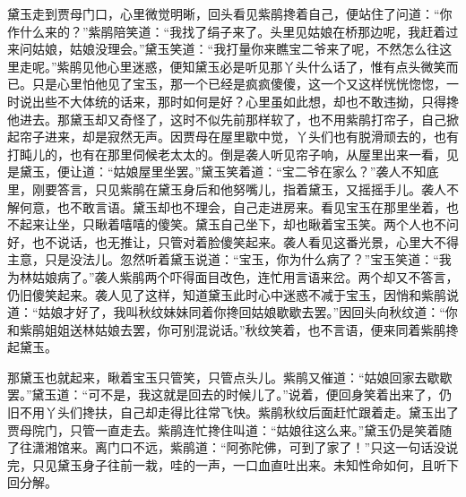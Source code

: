 \begin{parag}
    黛玉走到贾母门口，心里微觉明晰，回头看见紫鹃搀着自己，便站住了问道：“你作什么来的？”紫鹃陪笑道：“我找了绢子来了。头里见姑娘在桥那边呢，我赶着过来问姑娘，姑娘没理会。”黛玉笑道：“我打量你来瞧宝二爷来了呢，不然怎么往这里走呢。”紫鹃见他心里迷惑，便知黛玉必是听见那丫头什么话了，惟有点头微笑而已。只是心里怕他见了宝玉，那一个已经是疯疯傻傻，这一个又这样恍恍惚惚，一时说出些不大体统的话来，那时如何是好？心里虽如此想，却也不敢违拗，只得搀他进去。那黛玉却又奇怪了，这时不似先前那样软了，也不用紫鹃打帘子，自己掀起帘子进来，却是寂然无声。因贾母在屋里歇中觉，丫头们也有脱滑顽去的，也有打盹儿的，也有在那里伺候老太太的。倒是袭人听见帘子响，从屋里出来一看，见是黛玉，便让道：“姑娘屋里坐罢。”黛玉笑着道：“宝二爷在家么？”袭人不知底里，刚要答言，只见紫鹃在黛玉身后和他努嘴儿，指着黛玉，又摇摇手儿。袭人不解何意，也不敢言语。黛玉却也不理会，自己走进房来。看见宝玉在那里坐着，也不起来让坐，只瞅着嘻嘻的傻笑。黛玉自己坐下，却也瞅着宝玉笑。两个人也不问好，也不说话，也无推让，只管对着脸傻笑起来。袭人看见这番光景，心里大不得主意，只是没法儿。忽然听着黛玉说道：“宝玉，你为什么病了？”宝玉笑道：“我为林姑娘病了。”袭人紫鹃两个吓得面目改色，连忙用言语来岔。两个却又不答言，仍旧傻笑起来。袭人见了这样，知道黛玉此时心中迷惑不减于宝玉，因悄和紫鹃说道：“姑娘才好了，我叫秋纹妹妹同着你搀回姑娘歇歇去罢。”因回头向秋纹道：“你和紫鹃姐姐送林姑娘去罢，你可别混说话。”秋纹笑着，也不言语，便来同着紫鹃搀起黛玉。
\end{parag}


\begin{parag}
    那黛玉也就起来，瞅着宝玉只管笑，只管点头儿。紫鹃又催道：“姑娘回家去歇歇罢。”黛玉道：“可不是，我这就是回去的时候儿了。”说着，便回身笑着出来了，仍旧不用丫头们搀扶，自己却走得比往常飞快。紫鹃秋纹后面赶忙跟着走。黛玉出了贾母院门，只管一直走去。紫鹃连忙搀住叫道：“姑娘往这么来。”黛玉仍是笑着随了往潇湘馆来。离门口不远，紫鹃道：“阿弥陀佛，可到了家了！”只这一句话没说完，只见黛玉身子往前一栽，哇的一声，一口血直吐出来。未知性命如何，且听下回分解。
\end{parag}